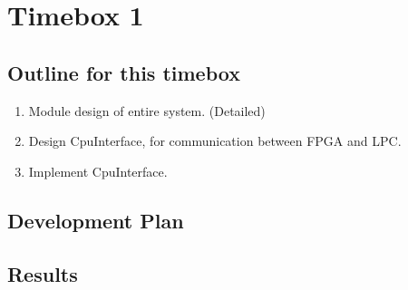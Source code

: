 \documentclass[12pt,a4paper]{report}
\begin{document}
\section{Timebox 1}

\subsection{Outline for this timebox}
\begin{enumerate}
\item Module design of entire system. (Detailed)
\item Design CpuInterface, for communication between FPGA and LPC.
\item Implement CpuInterface.
\end{enumerate}

\subsection{Development Plan}


\subsection{Results}


\end{document}
